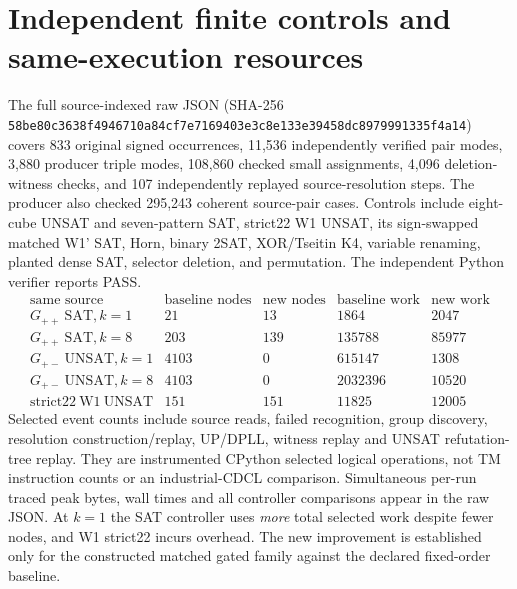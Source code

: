 \documentclass[10pt]{article}
\begin{document}
\section{Independent finite controls and same-execution resources}
The full source-indexed raw JSON (SHA-256 \texttt{58be80c3638f4946710a84cf7e7169403e3c8e133e39458dc8979991335f4a14}) covers 833 original signed occurrences, 11,536 independently verified pair modes, 3,880 producer triple modes, 108,860 checked small assignments, 4,096 deletion-witness checks, and 107 independently replayed source-resolution steps. The producer also checked 295,243 coherent source-pair cases. Controls include eight-cube UNSAT and seven-pattern SAT, strict22 W1 UNSAT, its sign-swapped matched W1' SAT, Horn, binary 2SAT, XOR/Tseitin K4, variable renaming, planted dense SAT, selector deletion, and permutation. The independent Python verifier reports PASS.
\[
\begin{array}{lrrrr}
\text{same source}&\text{baseline nodes}&\text{new nodes}&\text{baseline work}&\text{new work}\\
G_{++}\ \mathrm{SAT}, k=1&21&13&1864&2047\\
G_{++}\ \mathrm{SAT}, k=8&203&139&135788&85977\\
G_{+-}\ \mathrm{UNSAT}, k=1&4103&0&615147&1308\\
G_{+-}\ \mathrm{UNSAT}, k=8&4103&0&2032396&10520\\
\mathrm{strict22\ W1\ UNSAT}&151&151&11825&12005
\end{array}
\]
Selected event counts include source reads, failed recognition, group discovery, resolution construction/replay, UP/DPLL, witness replay and UNSAT refutation-tree replay. They are instrumented CPython selected logical operations, not TM instruction counts or an industrial-CDCL comparison. Simultaneous per-run traced peak bytes, wall times and all controller comparisons appear in the raw JSON. At $k=1$ the SAT controller uses \emph{more} total selected work despite fewer nodes, and W1 strict22 incurs overhead. The new improvement is established only for the constructed matched gated family against the declared fixed-order baseline.
\end{document}
